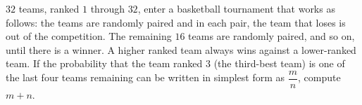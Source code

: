 $32$ teams, ranked $1$ through $32$, enter a basketball tournament that works as follows: the teams are randomly paired and in each pair, the team that loses is out of the competition. The remaining $16$ teams are randomly paired, and so on, until there is a winner. A higher ranked team always wins against a lower-ranked team. If the probability that the team ranked $3$ (the third-best team) is one of the last four teams remaining can be written in simplest form as $\dfrac{m}{n}$, compute $m+n$.